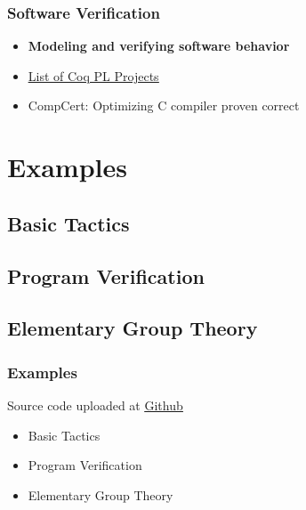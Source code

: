 \begin{frame}
    \frametitle{Software Verification}

    \begin{itemize}
        \item \textbf{Modeling and verifying software behavior}
        \item \href{https://github.com/coq/coq/wiki/List of Coq PL Projects}{\underline{List of Coq PL Projects}}
        \item CompCert: Optimizing C compiler proven correct
    \end{itemize}
\end{frame}

\section{Examples}
\subsection{Basic Tactics}
\subsection{Program Verification}
\subsection{Elementary Group Theory}
\begin{frame}
    \frametitle{Examples}

    Source code uploaded at \href{https://github.com/calofmijuck/presentations/tree/main/intro-coq}{\underline{Github}}

    \vspace*{10px}

    \begin{itemize}
        \setlength{\itemsep}{2em}
        \item Basic Tactics
        \item Program Verification
        \item Elementary Group Theory
    \end{itemize}
\end{frame}
